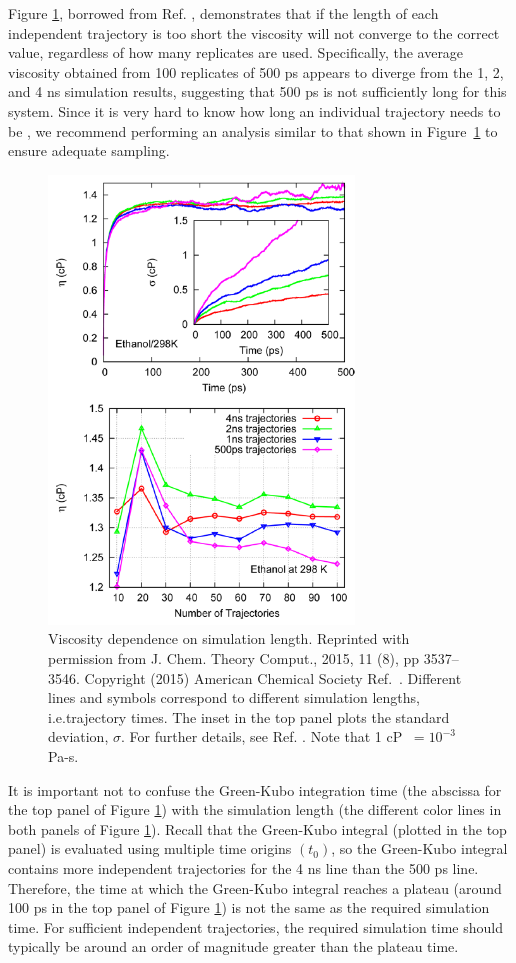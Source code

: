 \documentclass[9pt,bestpractices]{livecoms}
\providecommand{\DIFadd}[1]{{\protect\color{blue}\uwave{#1}}} %
\providecommand{\DIFaddbegin}{} %
\providecommand{\DIFaddend}{} %
\providecommand{\DIFaddFL}[1]{\DIFadd{#1}} %
\providecommand{\DIFaddbeginFL}{} %
\providecommand{\DIFaddendFL}{} %
\begin{document}
Figure \ref{fig:ZhangFig8}, borrowed from Ref. \cite{Zhang2015}, demonstrates that if the length of each independent trajectory is too short the viscosity will not converge to the correct value, regardless of how many replicates are used. Specifically, the average viscosity obtained from 100 replicates of 500 ps appears to diverge from the 1, 2, and 4 ns simulation results, suggesting that 500 ps is not sufficiently long for this system. Since it is very hard to know how long an individual trajectory needs to be \DIFaddbegin \textit{\DIFadd{a priori}}\DIFaddend , we recommend performing an analysis similar to that shown in Figure~\ref{fig:ZhangFig8} to ensure adequate sampling.

\begin{figure}[htb!]
	\centering
	\includegraphics[width=3.2in]{ZhangFig8.png}
	\caption{Viscosity dependence on simulation length. Reprinted with permission from J. Chem. Theory Comput., 2015, 11 (8), pp 3537–3546. Copyright (2015) American Chemical Society Ref.\ \cite{Zhang2015}. Different lines and symbols correspond to different simulation lengths, i.e.\DIFaddbeginFL \DIFaddFL{, }\DIFaddendFL trajectory times. The inset in the top panel plots the standard deviation, $\sigma$. For further details, see Ref. \cite{Zhang2015}. Note that 1 cP $\ = 10^{-3}$ Pa-s.}
	\label{fig:ZhangFig8}
\end{figure}

It is important not to confuse the Green-Kubo integration time (the abscissa for the top panel of Figure \ref{fig:ZhangFig8}) with the simulation length (the different color lines in both panels of Figure \ref{fig:ZhangFig8}). Recall that the Green-Kubo integral (plotted in the top panel) is evaluated using multiple time origins $(t_0)$, so the Green-Kubo integral contains more independent trajectories for the 4 ns line than the 500 ps line. Therefore, the time at which the Green-Kubo integral reaches a plateau (around 100 ps in the top panel of Figure \ref{fig:ZhangFig8}) is not the same as the required simulation time. For sufficient independent trajectories, the required simulation time should typically be around an order of magnitude greater than the plateau time.
\end{document}
